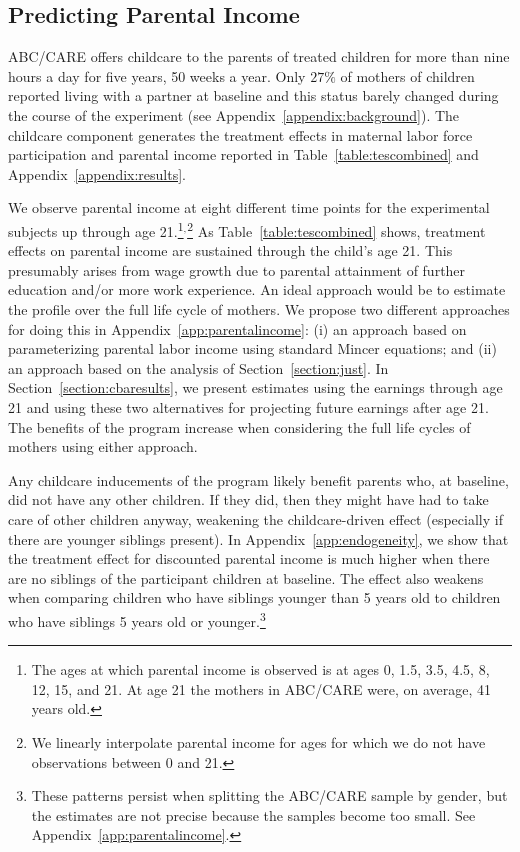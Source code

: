 \subsection{Predicting Parental Income} \label{section:pincome}

ABC/CARE offers childcare to the parents of treated children for more than nine hours a day for five years, 50 weeks a year. Only $27\%$ of mothers of children reported living with a partner at baseline and this status barely changed during the course of the experiment (see Appendix~\ref{appendix:background}). The childcare component generates the treatment effects in maternal labor force participation and parental income reported in Table~\ref{table:tescombined} and Appendix~\ref{appendix:results}.

We observe parental income at eight different time points for the experimental subjects up through age 21.\footnote{The ages at which parental income is observed is at ages 0, 1.5, 3.5, 4.5, 8, 12, 15, and 21. At age 21 the mothers in ABC/CARE were, on average, 41 years old.}$^,$\footnote{We linearly interpolate parental income for ages for which we do not have observations between 0 and 21.} As Table~\ref{table:tescombined} shows, treatment effects on parental income are sustained through the child's age 21. This presumably arises from wage growth due to parental attainment of further education and/or more work experience. An ideal approach would be to estimate the profile over the full life cycle of mothers. We propose two different approaches for doing this in Appendix~\ref{app:parentalincome}: (i) an approach based on parameterizing parental labor income using standard Mincer equations; and (ii) an approach based on the analysis of Section~\ref{section:just}. In Section~\ref{section:cbaresults}, we present estimates using the earnings through age 21 and using these two alternatives for projecting future earnings after age 21. The benefits of the program increase when considering the full life cycles of mothers using either approach.

Any childcare inducements of the program likely benefit parents who, at baseline, did not have any other children. If they did, then they might have had to take care of other children anyway, weakening the childcare-driven effect (especially if there are younger siblings present). In Appendix~\ref{app:endogeneity}, we show that the treatment effect for discounted parental income is much higher when there are no siblings of the participant children at baseline. The effect also weakens when comparing children who have siblings younger than 5 years old to children who have siblings 5 years old or younger.\footnote{These patterns persist when splitting the ABC/CARE sample by gender, but the estimates are not precise because the samples become too small. See Appendix~\ref{app:parentalincome}.}

